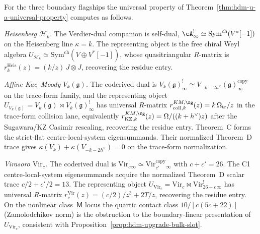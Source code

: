 \begin{example}
\label{ex:hdm-u-a-flagships}
For the three boundary flagships the universal property of
Theorem~\ref{thm:hdm-u-a-universal-property} computes as follows.

\emph{Heisenberg $\mathcal H_k$.} The Verdier-dual companion is
self-dual, $\cA^{!}_\infty \simeq \mathrm{Sym}^{\mathrm{ch}}(V^*[-1])$
on the Heisenberg line $\kappa = k$. The representing object is the
free chiral Weyl algebra
$U_{\mathcal H_k} \simeq \mathrm{Sym}^{\mathrm{ch}}(V \oplus V^*[-1])$,
whose quasitriangular $R$-matrix is
$r^{\mathrm{Heis}}_k(z) = (k/z)\, J \otimes J$, recovering the
residue entry.

\emph{Affine Kac--Moody $V_k(\mathfrak g)$.} The coderived dual is
$V_k(\mathfrak g)^{!}_\infty \simeq
V_{-k - 2 h^\vee}(\mathfrak g)^{\text{copy}}_\infty$ on the
trace-form family, and the representing object
$U_{V_k(\mathfrak g)} = V_k(\mathfrak g) \bowtie
V_k(\mathfrak g)^{!}_\infty$ has universal $R$-matrix
$r^{KM,\fg}_{\mathrm{coll},k}(z) = k\, \Omega_{\mathrm{tr}}/z$
in the trace-form collision lane, equivalently
$r^{KM,\fg}_{\mathrm{KZ},k}(z)=\Omega/((k+h^\vee)z)$ after the
Sugawara/KZ Casimir rescaling, recovering the residue entry.
Theorem~C forms the strict-flat centre-local-system eigensummands.
Their normalized Theorem~D trace gives
$\kappa(V_k)+\kappa(V_{-k-2h^\vee})=0$ on the trace-form
normalization.

\emph{Virasoro $\mathrm{Vir}_c$.} The coderived dual is
$\mathrm{Vir}_c^{!}_\infty \simeq \mathrm{Vir}_{c'}^{\text{copy}}_\infty$
with $c + c' = 26$.  The C1 centre-local-system eigensummands acquire
the normalized Theorem~D scalar trace $c/2+c'/2=13$. The representing
object $U_{\mathrm{Vir}_c} = \mathrm{Vir}_c \bowtie
\mathrm{Vir}_{26 - c}^{!}_\infty$ has universal $R$-matrix
$r^{\mathrm{Vir}}_c(z) = (c/2)/z^3 + 2T/z$, recovering the residue
entry.
On the nonlinear class~$\mathsf M$ locus the quartic contact class
$10/[c(5c+22)]$ (Zamolodchikov norm) is the obstruction to the
boundary-linear presentation of~$U_{\mathrm{Vir}_c}$, consistent with
Proposition~\ref{prop:hdm-upgrade-bulk-slot}.
\end{example}

